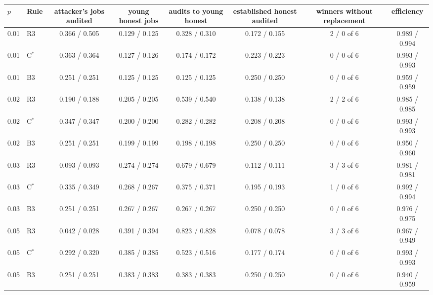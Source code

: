 \begin{tabular}{llcccccc}
\toprule
$p$ & Rule & attacker's jobs audited & young honest jobs & audits to young honest & established honest audited & winners without replacement & efficiency \\
\midrule
0.01 & R3 & 0.366 / 0.505 & 0.129 / 0.125 & 0.328 / 0.310 & 0.172 / 0.155 & 2 / 0 of 6 & 0.989 / 0.994 \\
0.01 & C$^*$ & 0.363 / 0.364 & 0.127 / 0.126 & 0.174 / 0.172 & 0.223 / 0.223 & 0 / 0 of 6 & 0.993 / 0.993 \\
0.01 & B3 & 0.251 / 0.251 & 0.125 / 0.125 & 0.125 / 0.125 & 0.250 / 0.250 & 0 / 0 of 6 & 0.959 / 0.959 \\
0.02 & R3 & 0.190 / 0.188 & 0.205 / 0.205 & 0.539 / 0.540 & 0.138 / 0.138 & 2 / 2 of 6 & 0.985 / 0.985 \\
0.02 & C$^*$ & 0.347 / 0.347 & 0.200 / 0.200 & 0.282 / 0.282 & 0.208 / 0.208 & 0 / 0 of 6 & 0.993 / 0.993 \\
0.02 & B3 & 0.251 / 0.251 & 0.199 / 0.199 & 0.198 / 0.198 & 0.250 / 0.250 & 0 / 0 of 6 & 0.950 / 0.960 \\
0.03 & R3 & 0.093 / 0.093 & 0.274 / 0.274 & 0.679 / 0.679 & 0.112 / 0.111 & 3 / 3 of 6 & 0.981 / 0.981 \\
0.03 & C$^*$ & 0.335 / 0.349 & 0.268 / 0.267 & 0.375 / 0.371 & 0.195 / 0.193 & 1 / 0 of 6 & 0.992 / 0.994 \\
0.03 & B3 & 0.251 / 0.251 & 0.267 / 0.267 & 0.267 / 0.267 & 0.250 / 0.250 & 0 / 0 of 6 & 0.976 / 0.975 \\
0.05 & R3 & 0.042 / 0.028 & 0.391 / 0.394 & 0.823 / 0.828 & 0.078 / 0.078 & 3 / 3 of 6 & 0.967 / 0.949 \\
0.05 & C$^*$ & 0.292 / 0.320 & 0.385 / 0.385 & 0.523 / 0.516 & 0.177 / 0.174 & 0 / 0 of 6 & 0.993 / 0.993 \\
0.05 & B3 & 0.251 / 0.251 & 0.383 / 0.383 & 0.383 / 0.383 & 0.250 / 0.250 & 0 / 0 of 6 & 0.940 / 0.959 \\
\bottomrule
\end{tabular}
